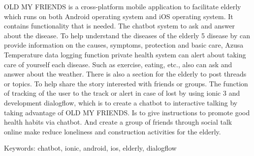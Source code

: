 \begin{englishabstract}
    OLD MY FRIENDS is a cross-platform mobile application to facilitate elderly which runs 
    on both Android operating system and iOS operating system. It contains functionality 
    that is needed. The chatbot system to ask and answer about the disease. To help understand 
    the diseases of the elderly 5 disease by can provide information on the causes, symptoms, 
    protection and basic care, Azusa Temperature data logging function private health system 
    can alert about taking care of yourself each disease. Such as exercise, eating, etc., 
    also can ask and answer about the weather. There is also a section for the elderly to post 
    threads or topics. To help share the story interested with friends or groups. The function of 
    tracking of the user to the track or alert in case of lost by using ionic 3 and development 
    dialogflow, which is to create a chatbot to interactive talking by taking advantage of OLD MY FRIENDS. 
    Is to give instructions to promote good health habits via chatbot. And create a group of friends 
    through social talk online make reduce loneliness and construction activities for the elderly.


\noindent
Keywords: chatbot, ionic, android, ios, elderly, dialogflow
\end{englishabstract}

